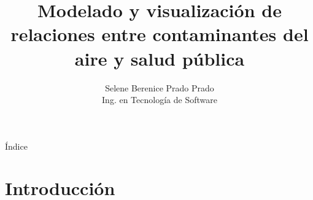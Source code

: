\documentclass[11pt]{beamer}
\begin{document}
\title[Defensa de Tesis  \hspace{35mm} \insertframenumber/\inserttotalframenumber]{Modelado y visualización de relaciones entre contaminantes del aire y salud pública}
\centering {}
\author{Selene Berenice Prado Prado \\ Ing. en Tecnología de Software}
\begin{frame}
\begin{center}
\end{center}
\vspace{-1cm}
\titlepage
\end{frame}

\begin{frame}{Índice}
\transdissolve
\begin{center}
\begin{multicols}{2}
  \footnotesize{\tableofcontents}	
\end{multicols}
\end{center}
\end{frame}


\section{Introducción}
\end{document}
